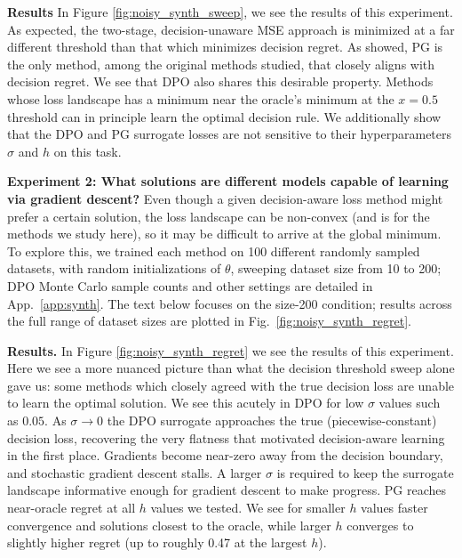 \textbf{Results} In Figure \ref{fig:noisy_synth_sweep}, we see the results of this experiment. As expected, the two-stage, decision-unaware MSE approach is minimized at a far different threshold than that which minimizes decision regret. As \citeauthor{huang2024decisionfocusedPG} showed, PG is the only method, among the original methods studied, that closely aligns with decision regret. We see that DPO also shares this desirable property. Methods whose loss landscape has a minimum near the oracle's minimum at the $x=0.5$ threshold can in principle learn the optimal decision rule. We additionally show that the DPO and PG surrogate losses are not sensitive to their hyperparameters $\sigma$ and $h$ on this task.


\textbf{Experiment 2: What solutions are different models capable of learning via gradient descent?} Even though a given decision-aware loss method might prefer a certain solution, the loss landscape can be non-convex (and is for the methods we study here), so it may be difficult to arrive at the global minimum. To explore this, we trained each method on 100 different randomly sampled datasets, with random initializations of $\theta$, sweeping dataset size from 10 to 200; DPO Monte Carlo sample counts and other settings are detailed in App.~\ref{app:synth}. The text below focuses on the size-200 condition; results across the full range of dataset sizes are plotted in Fig.~\ref{fig:noisy_synth_regret}.

\textbf{Results.}
In Figure \ref{fig:noisy_synth_regret} we see the results of this experiment. Here we see a more nuanced picture than what the decision threshold sweep alone gave us: some methods which closely agreed with the true decision loss are unable to learn the optimal solution. We see this acutely in DPO for low $\sigma$ values such as $0.05$. As $\sigma \rightarrow 0$ the DPO surrogate approaches the true (piecewise-constant) decision loss, recovering the very flatness that motivated decision-aware learning in the first place. Gradients become near-zero away from the decision boundary, and stochastic gradient descent stalls. A larger $\sigma$ is required to keep the surrogate landscape informative enough for gradient descent to make progress. PG reaches near-oracle regret at all $h$ values we tested. We see for smaller $h$ values faster convergence and solutions closest to the oracle, while larger $h$ converges to slightly higher regret (up to roughly 0.47 at the largest $h$).
